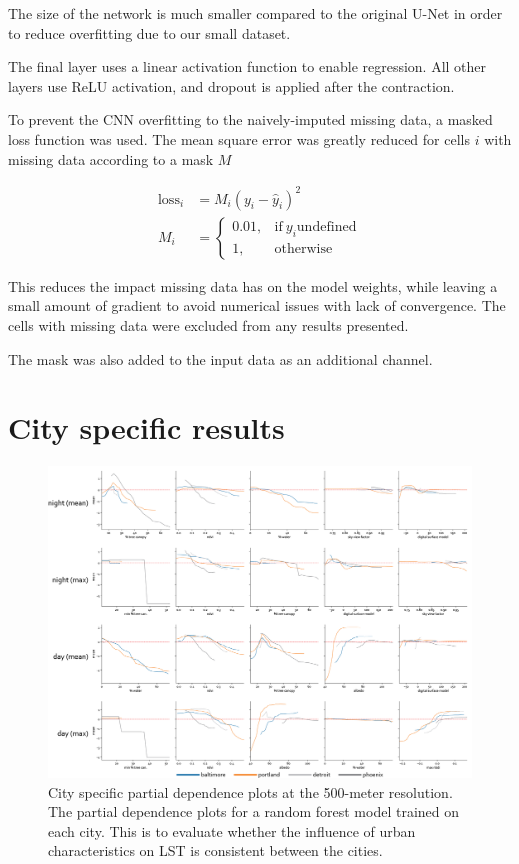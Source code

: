 \documentclass[final,3p,times,twocolumn,sort&compress]{elsarticle}
\begin{document}
The size of the network is much smaller compared to the original U-Net in order to reduce overfitting due to our small dataset.

The final layer uses a linear activation function to enable regression. All other layers use ReLU activation, and dropout is applied after the contraction.

To prevent the CNN overfitting to the naively-imputed missing data, a masked loss function was used. The mean square error was greatly reduced for cells $i$ with missing data according to a mask $M$

\begin{align*}
    \mathrm{loss}_i &= M_i(y_i - \hat y _i) ^ 2\\
    M_i &= \begin{cases}
      0.01, & \text{if}\ y_i \mathrm{undefined} \\
      1, & \text{otherwise}
    \end{cases}
\end{align*}

This reduces the impact missing data has on the model weights, while leaving a small amount of gradient to avoid numerical issues with lack of convergence. The cells with missing data were excluded from any results presented.

The mask was also added to the input data as an additional channel.





\newpage
\section{City specific results}
\label{ss:city}
\begin{figure}[h]
    \centering
    \includegraphics[width=\linewidth]{fig/report/pdp_cities_500.png}
    \caption[City specific partial dependence plots at the 500-meter resolution]{
    City specific partial dependence plots at the 500-meter resolution.
    The partial dependence plots for a random forest model trained on each city.
    This is to evaluate whether the influence of urban characteristics on LST is consistent between the cities.
    }
    \label{fig:cities_500}
\end{figure}
\end{document}
